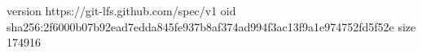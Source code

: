 version https://git-lfs.github.com/spec/v1
oid sha256:2f6000b07b92ead7edda845fe937b8af374ad994f3ac13f9a1e974752fd5f52e
size 174916
